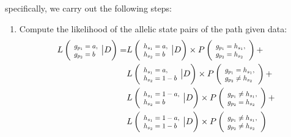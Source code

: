\documentclass{bioinfo}
\newcommand*{\Scale}[2][4]{\scalebox{#1}{$#2$}}%
\begin{document}
specifically, we carry out the following steps:
\begin{enumerate}
\item Compute the likelihood of the allelic state pairs of the path given data:
\begin{equation}
\begin{split}
L\left( \Scale[0.8]{ \begin{array}{l} g_{p_1} = a, \\g_{p_2} = b \end{array}} \big{|} D\right) = & L\left(\Scale[0.8]{\begin{array}{l}h_{s_1} = a,\\ h_{s_2} = b \end{array}} \big{|} D \right) \times P\left(\Scale[0.8]{\begin{array}{l}g_{p_1} = h_{s_1}, \\g_{p_2}= h_{s_2}\end{array}} \right)  + \\
                                         & L\left(\Scale[0.8]{\begin{array}{l}h_{s_1} = a, \\h_{s_2} = 1-b \end{array}} \big{|} D \right) \times P\left(\Scale[0.8]{\begin{array}{l}g_{p_1} = h_{s_1}, \\g_{p_2} \neq h_{s_2}\end{array}} \right)  + \\
                                         & L\left(\Scale[0.8]{\begin{array}{l}h_{s_1} = 1-a, \\h_{s_2} = b \end{array}} \big{|} D \right) \times P\left(\Scale[0.8]{\begin{array}{l}g_{p_1} \neq h_{s_1}, \\g_{p_2} = h_{s_2}\end{array}} \right)  + \\
                                         & L\left(\Scale[0.8]{\begin{array}{l}h_{s_1} = 1-a, \\h_{s_2} = 1-b \end{array}} \big{|} D \right) \times P\left(\Scale[0.8]{\begin{array}{l}g_{p_1} \neq h_{s_1}, \\g_{p_2} \neq h_{s_2}\end{array}} \right)
\end{split}\label{eqn:llk_given_D:two}

\end{equation}
\end{enumerate}
\end{document}
